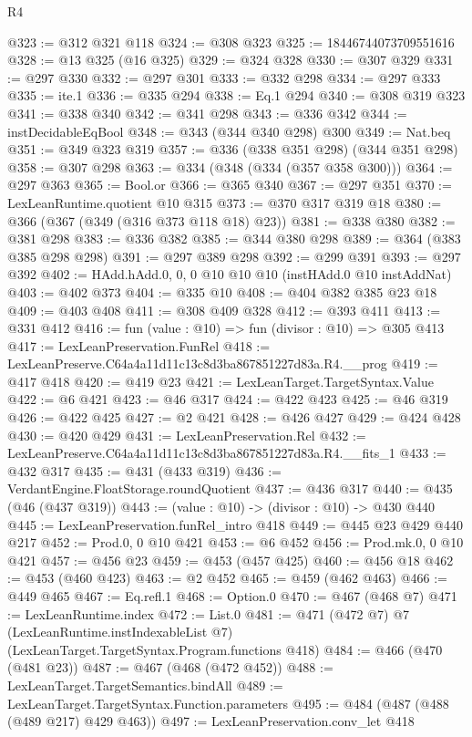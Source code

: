 \begin{lexlean}{R4}
\begin{coremodule}
@323 := @312 @321 @118
@324 := @308 @323
@325 := 18446744073709551616
@328 := @13 @325 (@16 @325)
@329 := @324 @328
@330 := @307 @329
@331 := @297 @330
@332 := @297 @301
@333 := @332 @298
@334 := @297 @333
@335 := ite.{1}
@336 := @335 @294
@338 := Eq.{1} @294
@340 := @308 @319 @323
@341 := @338 @340
@342 := @341 @298
@343 := @336 @342
@344 := instDecidableEqBool
@348 := @343 (@344 @340 @298) @300
@349 := Nat.beq
@351 := @349 @323 @319
@357 := @336 (@338 @351 @298) (@344 @351 @298)
@358 := @307 @298
@363 := @334 (@348 (@334 (@357 @358 @300)))
@364 := @297 @363
@365 := Bool.or
@366 := @365 @340
@367 := @297 @351
@370 := LexLeanRuntime.quotient @10 @315
@373 := @370 @317 @319 @18
@380 := @366 (@367 (@349 (@316 @373 @118 @18) @23))
@381 := @338 @380
@382 := @381 @298
@383 := @336 @382
@385 := @344 @380 @298
@389 := @364 (@383 @385 @298 @298)
@391 := @297 @389 @298
@392 := @299 @391
@393 := @297 @392
@402 := HAdd.hAdd.{0, 0, 0} @10 @10 @10 (instHAdd.{0} @10 instAddNat)
@403 := @402 @373
@404 := @335 @10
@408 := @404 @382 @385 @23 @18
@409 := @403 @408
@411 := @308 @409 @328
@412 := @393 @411
@413 := @331 @412
@416 := fun (value : @10) => fun (divisor : @10) => @305 @413
@417 := LexLeanPreservation.FunRel
@418 := LexLeanPreserve.C64a4a11d11c13c8d3ba867851227d83a.R4.__prog
@419 := @417 @418
@420 := @419 @23
@421 := LexLeanTarget.TargetSyntax.Value
@422 := @6 @421
@423 := @46 @317
@424 := @422 @423
@425 := @46 @319
@426 := @422 @425
@427 := @2 @421
@428 := @426 @427
@429 := @424 @428
@430 := @420 @429
@431 := LexLeanPreservation.Rel
@432 := LexLeanPreserve.C64a4a11d11c13c8d3ba867851227d83a.R4.__fits_1
@433 := @432 @317
@435 := @431 (@433 @319)
@436 := VerdantEngine.FloatStorage.roundQuotient
@437 := @436 @317
@440 := @435 (@46 (@437 @319))
@443 := (value : @10) -> (divisor : @10) -> @430 @440
@445 := LexLeanPreservation.funRel_intro @418
@449 := @445 @23 @429 @440 @217
@452 := Prod.{0, 0} @10 @421
@453 := @6 @452
@456 := Prod.mk.{0, 0} @10 @421
@457 := @456 @23
@459 := @453 (@457 @425)
@460 := @456 @18
@462 := @453 (@460 @423)
@463 := @2 @452
@465 := @459 (@462 @463)
@466 := @449 @465
@467 := Eq.refl.{1}
@468 := Option.{0}
@470 := @467 (@468 @7)
@471 := LexLeanRuntime.index
@472 := List.{0}
@481 := @471
    (@472 @7)
    @7
    (LexLeanRuntime.instIndexableList @7)
    (LexLeanTarget.TargetSyntax.Program.functions @418)
@484 := @466 (@470 (@481 @23))
@487 := @467 (@468 (@472 @452))
@488 := LexLeanTarget.TargetSemantics.bindAll
@489 := LexLeanTarget.TargetSyntax.Function.parameters
@495 := @484 (@487 (@488 (@489 @217) @429 @463))
@497 := LexLeanPreservation.conv_let @418

\end{coremodule}
\end{lexlean}
